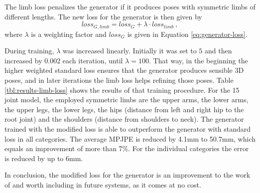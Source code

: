 The limb loss penalizes the generator if it produces poses with symmetric limbs of different lengths.
The new loss for the generator is then given by
\begin{equation}
	loss_{G, limb} = loss_G + \lambda \cdot loss_{limb} \ ,
\end{equation}
where $\lambda$ is a weighting factor and $loss_G$ is given in Equation \eqref{eq:generator-loss}.



During training, $\lambda$ was increased linearly.
Initially it was set to $5$ and then increased by $0.002$ each iteration, until $\lambda = 100$.
That way, in the beginning the higher weighted standard loss ensures that the generator produces sensible 3D poses, and in later iterations the limb loss helps refining those poses.
Table \ref{tbl:results-limb-loss} shows the results of that training procedure.
For the 15 joint model, the employed symmetric limbs are the upper arms, the lower arms, the upper legs, the lower legs, the hips (distance from left and right hip to the root joint) and the shoulders (distance from shoulders to neck). 
The generator trained with the modified loss is able to outperform the generator with standard loss in all categories.
The average MPJPE is reduced by 4.1mm to 50.7mm, which equals an improvement of more than 7\%.
For the individual categories the error is reduced by up to 6mm.

In conclusion, the modified loss for the generator is an improvement to the work of \citet{drover18} and worth including in future systems, as it comes at no cost.



